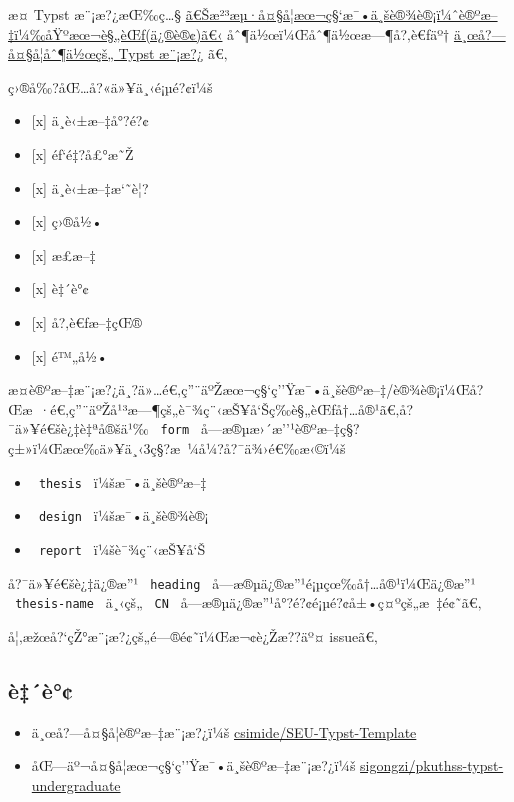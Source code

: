æ­¤ Typst æ¨¡æ?¿æŒ‰ç\ldots§
\href{https://bylw.hhu.edu.cn/UpLoadFile/83cd5f1169974a0db06d865c7ee11af4.pdf}{ã€Šæ²³æµ·å¤§å­¦æœ¬ç§`æ¯•ä¸šè®¾è®¡ï¼ˆè®ºæ--‡ï¼‰åŸºæœ¬è§„èŒƒ(ä¿®è®¢)ã€‹}
åˆ¶ä½œï¼Œåˆ¶ä½œæ---¶å?‚è€ƒäº†
\href{https://github.com/csimide/SEU-Typst-Template}{ä¸œå?---å¤§å­¦åˆ¶ä½œçš„
Typst æ¨¡æ?¿} ã€‚

ç›®å‰?åŒ\ldots å?«ä»¥ä¸‹é¡µé?¢ï¼š

\begin{itemize}
\tightlist
\item
  {[}x{]} ä¸­è‹±æ--‡å°?é?¢
\item
  {[}x{]} éƒ`é‡?å£°æ˜Ž
\item
  {[}x{]} ä¸­è‹±æ--‡æ`˜è¦?
\item
  {[}x{]} ç›®å½•
\item
  {[}x{]} æ­£æ--‡
\item
  {[}x{]} è‡´è°¢
\item
  {[}x{]} å?‚è€ƒæ--‡çŒ®
\item
  {[}x{]} é™„å½•
\end{itemize}

æ­¤è®ºæ--‡æ¨¡æ?¿ä¸?ä»\ldots é€‚ç''¨äºŽæœ¬ç§`ç''Ÿæ¯•ä¸šè®ºæ--‡/è®¾è®¡ï¼Œå?Œæ~·é€‚ç''¨äºŽå¹³æ---¶çš„è¯¾ç¨‹æŠ¥å`Šç­‰è§„èŒƒå†\ldots å®¹ã€‚å?¯ä»¥é€šè¿‡è‡ªå®šä¹‰
\texttt{\ form\ }
å­---æ®µæ›´æ''¹è®ºæ--‡ç§?ç±»ï¼Œæœ‰ä»¥ä¸‹3ç§?æ~¼å¼?å?¯ä¾›é€‰æ‹©ï¼š

\begin{itemize}
\tightlist
\item
  \texttt{\ thesis\ } ï¼šæ¯•ä¸šè®ºæ--‡
\item
  \texttt{\ design\ } ï¼šæ¯•ä¸šè®¾è®¡
\item
  \texttt{\ report\ } ï¼šè¯¾ç¨‹æŠ¥å`Š
\end{itemize}

å?¯ä»¥é€šè¿‡ä¿®æ''¹ \texttt{\ heading\ }
å­---æ®µä¿®æ''¹é¡µçœ‰å†\ldots å®¹ï¼Œä¿®æ''¹ \texttt{\ thesis-name\ }
ä¸‹çš„ \texttt{\ CN\ } å­---æ®µä¿®æ''¹å°?é?¢é¡µé?¢å±•ç¤ºçš„æ~‡é¢˜ã€‚

å¦‚æžœå?{}`çŽ°æ¨¡æ?¿çš„é---®é¢˜ï¼Œæ¬¢è¿Žæ??äº¤ issueã€‚

\subsection{è‡´è°¢}\label{uxe8uxe8}

\begin{itemize}
\item
  ä¸œå?---å¤§å­¦è®ºæ--‡æ¨¡æ?¿ï¼š
  \href{https://github.com/csimide/SEU-Typst-Template}{csimide/SEU-Typst-Template}
\item
  åŒ---äº¬å¤§å­¦æœ¬ç§`ç''Ÿæ¯•ä¸šè®ºæ--‡æ¨¡æ?¿ï¼š
  \href{https://github.com/sigongzi/pkuthss-typst-undergraduate}{sigongzi/pkuthss-typst-undergraduate}
\end{itemize}

